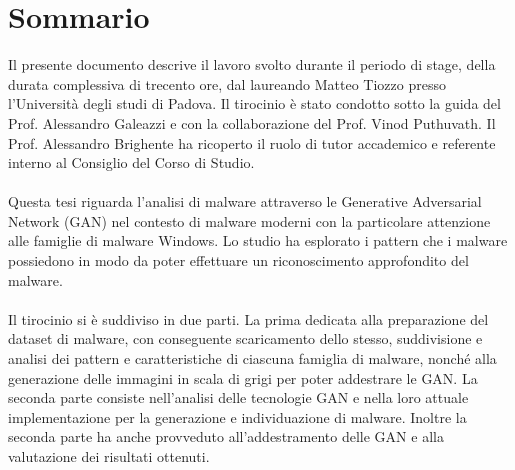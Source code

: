 \cleardoublepage
{}
{}
\begingroup
\let\clearpage\relax
\let\cleardoublepage\relax
\let\cleardoublepage\relax

\chapter*{Sommario}

Il presente documento descrive il lavoro svolto durante il periodo di stage, della durata complessiva di trecento ore, dal laureando Matteo Tiozzo presso l'Università degli studi di Padova.
Il tirocinio è stato condotto sotto la guida del Prof. Alessandro Galeazzi e con la collaborazione del Prof. Vinod Puthuvath.
Il Prof. Alessandro Brighente ha ricoperto il ruolo di tutor accademico e referente interno al Consiglio del Corso di Studio.
\\\\
Questa tesi riguarda l'analisi di malware attraverso le Generative Adversarial Network (GAN) nel contesto di malware moderni con la particolare attenzione alle famiglie di malware Windows. 
Lo studio ha esplorato i pattern che i malware possiedono in modo da poter effettuare un riconoscimento approfondito del malware. 
\\\\
Il tirocinio si è suddiviso in due parti.
La prima dedicata alla preparazione del dataset di malware, con conseguente scaricamento dello stesso, suddivisione e analisi dei pattern e caratteristiche di ciascuna famiglia di malware, nonché alla generazione delle immagini in scala di grigi per poter addestrare le GAN. La seconda parte consiste nell'analisi delle tecnologie GAN e nella loro attuale implementazione per la generazione e individuazione di malware. Inoltre la seconda parte ha anche provveduto all'addestramento delle GAN e alla valutazione dei risultati ottenuti.



\endgroup

\vfill
